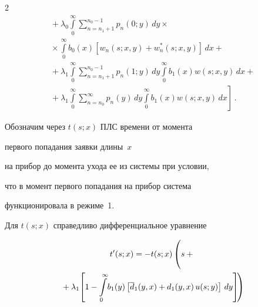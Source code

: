 \begin{multicols}{2}
\begin{multline*}
{}+


\lambda_0 \int\limits_0^\infty \sum\limits_{n=n_1+1}^{n_0-1} p_n(0;y)\, dy\times{}\\


{}\times


\int\limits_0^\infty b_0(x) \left[w_n(s;x,y) + w^*_n(s;x,y)\right]\, dx


+{}


\\


{}+


\lambda_1 \int\limits_0^\infty \sum\limits_{n=n_1+1}^{n_0-1} p_n(1;y) \, dy


\int\limits_0^\infty b_1(x) w(s;x,y) \, dx


+{}\\


\left.{}+


\lambda_1 \int\limits_0^\infty \sum\limits_{n=n_0}^{\infty} p_n(y) \, dy


\int\limits_0^\infty b_1(x) w(s;x,y) \, dx


\right]\,.


\end{multline*}





Обозначим через $t(s;x)$ ПЛС времени от момента


первого попадания заявки длины~$x$


на прибор до момента ухода ее из системы при условии,


что в момент первого попадания на прибор система


функционировала в режиме~1.


Для $t(s;x)$ справедливо дифференциальное уравнение


\begin{multline*}


t'(s;x)= - t(s;x) \left( \vphantom{\int\limits_0^\infty}


s + {}\right.\\


\!\!\left.{}+\lambda_1 \!\left[


1 - \int\limits_0^\infty\! b_1(y)\left[\d_1(y,x) +


d_1(y,x)\, u(s;y)\vphantom{\overline{d}}\right] \, dy


\right]\!


\right)\hspace*{-1.717pt}


\end{multline*}



\end{multicols}
